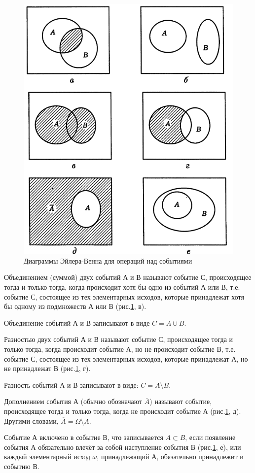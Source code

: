 \documentclass{book}
\begin{document}
\begin{figure}[h!]
  \centering
  \includegraphics[width=.7\textwidth]{./pictures/2.png}
  \caption{Диаграммы Эйлера-Венна для операций над событиями}
  \label{fig:2}
\end{figure}

Объединением (суммой) двух событий А и В называют событие С,
происходящее тогда и только тогда,
когда происходит хотя бы одно из событий А или В, т.е.
событие С, состоящее из тех элементарных исходов, которые принадлежат хотя бы одному из подмножеств А или В (рис.\ref{fig:2}, в).

Объединение событий А и В записывают в виде $ C = A \cup B $.

Разностью двух событий А и В называют событие С,
происходящее тогда и только тогда,
когда происходит событие А,
но не происходит событие В, т.е. событие С, состоящее из тех элементарных исходов, которые принадлежат А, но не принадлежат В (рис.\ref{fig:2}, г).

Разность событий А и В записывают в виде: $ C = A \setminus B $.

Дополнением события А (обычно обозначают $ \overline{A} $) называют событие, происходящее тогда и только тогда, когда не происходит событие А (рис.\ref{fig:2}, д).
Другими словами, $ \overline{A} = \Omega \setminus A $.

Событие А включено в событие В,
что записывается $ A \subset B $,
если появление события А обязательно влечёт за собой наступление события В (рис.\ref{fig:2}, е),
или каждый элементарный исход $ \omega $, принадлежащий А, обязательно принадлежит и событию В.
\end{document}
